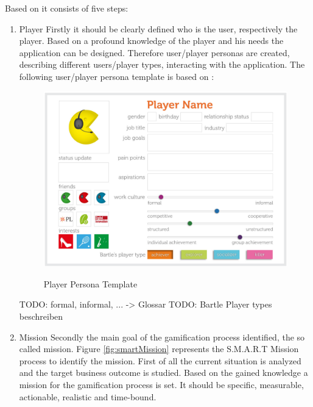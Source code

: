 Based on \cite[p. 29-32]{inproceedings} it consists of five steps:
\begin{enumerate}
	\item Player \newline
	Firstly it should be clearly defined who is the user, respectively the player. Based on a profound knowledge of the player and his needs the application can be designed. Therefore user/player personas are created, describing different users/player types, interacting with the application. The following user/player persona template is based on \cite[p. 38-45]{inproceedings}:

	\begin{figure}[htbp] 
		\centering
		\includegraphics[width=1.0\textwidth]{Content/Theory/PlayerPersona.png}
		\caption{Player Persona Template}
		\cite[p. 46]{inproceedings}
		\label{fig:playerPersonaTemplate}
	\end{figure}

	TODO: formal, informal, ... -> Glossar
	TODO: Bartle Player types beschreiben
	
	\item Mission \newline
	Secondly the main goal of the gamification process identified, the so called mission. Figure \ref{fig:smartMission} represents the S.M.A.R.T Mission process to identify the mission. First of all the current situation is analyzed and the target business outcome is studied. Based on the gained knowledge a mission for the gamification process is set. It should be specific, measurable, actionable, realistic and time-bound. \cite[p. 49-52]{inproceedings}
	

\end{enumerate}
